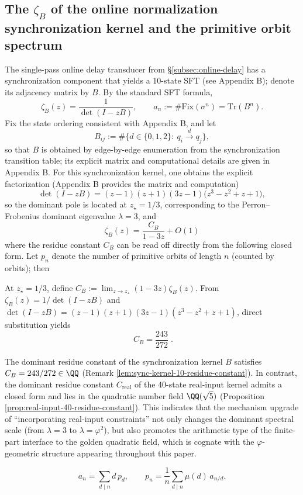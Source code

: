 \subsection{The \texorpdfstring{$\zeta_B$}{zeta\_B} of the online normalization synchronization kernel and the primitive orbit spectrum}\label{subsec:zeta-online-kernel}
The single-pass online delay transducer from \S\ref{subsec:online-delay} has a synchronization component that yields a 10-state SFT (see Appendix B); denote its adjacency matrix by $B$. By the standard SFT formula,
\[
\zeta_B(z)=\frac{1}{\det(I-zB)},\qquad
a_n:=\#\mathrm{Fix}(\sigma^n)=\mathrm{Tr}(B^n).
\]
Fix the state ordering consistent with Appendix B, and let
\[
B_{ij}:=\#\{d\in\{0,1,2\}:\ q_i\xrightarrow{d}q_j\},
\]
so that $B$ is obtained by edge-by-edge enumeration from the synchronization transition table; its explicit matrix and computational details are given in Appendix B.
For this synchronization kernel, one obtains the explicit factorization (Appendix B provides the matrix and computation)
\[
\det(I-zB)=(z-1)(z+1)(3z-1)\bigl(z^3-z^2+z+1\bigr),
\]
so the dominant pole is located at $z_\star=1/3$, corresponding to the Perron--Frobenius dominant eigenvalue $\lambda=3$, and
\[
\zeta_B(z)=\frac{C_B}{1-3z}+O(1)
\]
where the residue constant \(C_B\) can be read off directly from the following closed form. Let $p_n$ denote the number of primitive orbits of length $n$ (counted by orbits); then

\begin{remark}\label{lem:sync-kernel-10-residue-constant}
At \(z_\star=1/3\), define
\(
C_B:=\lim_{z\to z_\star}(1-3z)\zeta_B(z)
\).
From \(\zeta_B(z)=1/\det(I-zB)\) and
\(
\det(I-zB)=(z-1)(z+1)(3z-1)(z^3-z^2+z+1)
\),
direct substitution yields
\[
\boxed{\; C_B=\frac{243}{272}\; }.
\]
\end{remark}

\begin{remark}\label{rem:residue-field-sync-vs-real}
The dominant residue constant of the synchronization kernel \(B\) satisfies \(C_B=243/272\in\QQ\) (Remark \ref{lem:sync-kernel-10-residue-constant}).
In contrast, the dominant residue constant \(C_{\mathrm{real}}\) of the 40-state real-input kernel admits a closed form and lies in the quadratic number field \(\QQ(\sqrt5)\) (Proposition \ref{prop:real-input-40-residue-constant}).
This indicates that the mechanism upgrade of ``incorporating real-input constraints'' not only changes the dominant spectral scale (from \(\lambda=3\) to \(\lambda=\varphi^2\)), but also promotes the arithmetic type of the finite-part interface to the golden quadratic field, which is cognate with the \(\varphi\)-geometric structure appearing throughout this paper.
\end{remark}
\[
a_n=\sum_{d\mid n} d\,p_d,
\qquad
p_n=\frac{1}{n}\sum_{d\mid n}\mu(d)\,a_{n/d}.
\]

